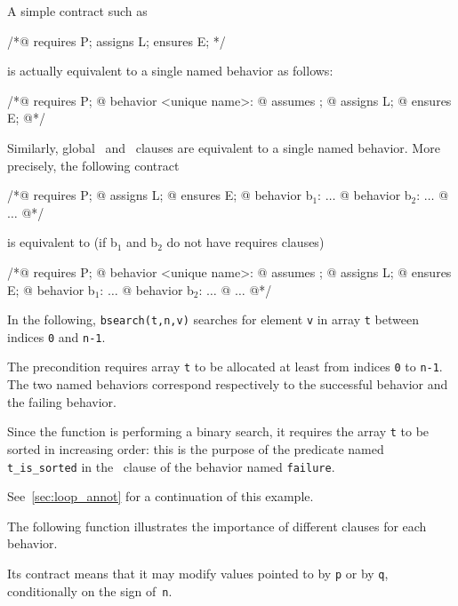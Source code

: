 A simple contract such as
\begin{listing}{1}
/*@ requires P; assigns L; ensures E; */
\end{listing}
is actually equivalent to a single named behavior as follows:
\begin{listing}{1}
/*@ requires P;
  @ behavior <unique name>:
  @   assumes \true;
  @   assigns L;
  @   ensures E;
  @*/
\end{listing}
Similarly, global \assigns\ and \ensures\ clauses are equivalent to a
single named behavior. More precisely, the following contract
\begin{listing}{1}
/*@ requires P;
  @ assigns L;
  @ ensures E;
  @ behavior b$_1$: $\dots$
  @ behavior b$_2$: $\dots$
  @ $\dots$
  @*/
\end{listing}
is equivalent to (if b$_1$ and b$_2$ do not have requires clauses)
\begin{listing}{1}
/*@ requires P;
  @ behavior <unique name>:
  @   assumes \true;
  @   assigns L;
  @   ensures E;
  @ behavior b$_1$: $\dots$
  @ behavior b$_2$: $\dots$
  @ $\dots$
  @*/
\end{listing}

\begin{example}
\label{ex:bsearch}
In the following, \lstinline|bsearch(t,n,v)| searches for element \lstinline|v|
in array \lstinline|t| between indices \lstinline|0| and \lstinline|n-1|.

%
The precondition requires array \lstinline|t| to be allocated at least
from indices \lstinline|0|
to \lstinline|n-1|. The two named behaviors
correspond respectively to the successful behavior and the failing
behavior.

Since the function is performing a binary search, it requires the
array \lstinline|t| to be sorted in increasing order: this is the purpose of
the predicate named \lstinline|t_is_sorted| in the \assumes\ clause of the
behavior named \lstinline|failure|.

See~\ref{sec:loop_annot} for a continuation of this example.
\end{example}

\begin{example}
  The following function illustrates the importance of different
  \assigns{} clauses for each behavior.

%
  Its contract means that it may modify values pointed to by
  \lstinline|p| or by \lstinline|q|,
  conditionally on the sign of~\lstinline|n|.
\end{example}


